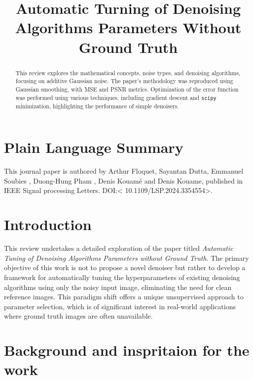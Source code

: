 \documentclass[
]{agujournal2019}
\begin{document}
\title{Automatic Turning of Denoising Algorithms Parameters Without
Ground Truth}



\begin{abstract}
This review explores the mathematical concepts, noise types, and
denoising algorithms, focusing on additive Gaussian noise. The paper's
methodology was reproduced using Gaussian smoothing, with MSE and PSNR
metrics. Optimization of the error function was performed using various
techniques, including gradient descent and \texttt{scipy} minimization,
highlighting the performance of simple denoisers.
\end{abstract}

\section*{Plain Language Summary}
This journal paper is authored by Arthur Floquet, Sayantan Dutta,
Emmanuel Soubies , Duong-Hung Pham , Denis Kouamé and Denis Kouame,
published in IEEE Signal processing Letters. DOI:\textless{}
10.1109/LSP.2024.3354554\textgreater.




\section{Introduction}\label{introduction}

This review undertakes a detailed exploration of the paper titled
\emph{Automatic Tuning of Denoising Algorithms Parameters without Ground
Truth}. The primary objective of this work is not to propose a novel
denoiser but rather to develop a framework for automatically tuning the
hyperparameters of existing denoising algorithms using only the noisy
input image, eliminating the need for clean reference images. This
paradigm shift offers a unique unsupervised approach to parameter
selection, which is of significant interest in real-world applications
where ground truth images are often unavailable.

\section{Background and inspritaion for the
work}\label{background-and-inspritaion-for-the-work}
\end{document}
